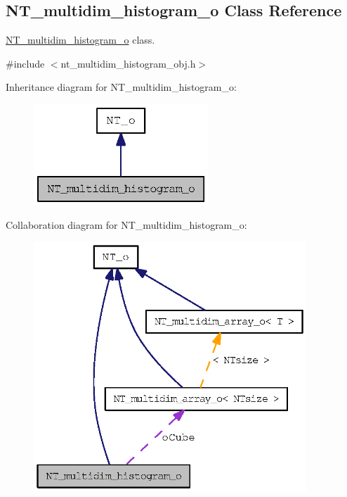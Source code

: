 \subsection{NT\_\-multidim\_\-histogram\_\-o Class Reference}
\label{class_n_t__multidim__histogram__o}


\hyperlink{class_n_t__multidim__histogram__o}{NT\_\-multidim\_\-histogram\_\-o} class.  




{\ttfamily \#include $<$nt\_\-multidim\_\-histogram\_\-obj.h$>$}



Inheritance diagram for NT\_\-multidim\_\-histogram\_\-o:
\nopagebreak
\begin{figure}[H]
\begin{center}
\leavevmode
\includegraphics[width=186pt]{class_n_t__multidim__histogram__o__inherit__graph}
\end{center}
\end{figure}


Collaboration diagram for NT\_\-multidim\_\-histogram\_\-o:
\nopagebreak
\begin{figure}[H]
\begin{center}
\leavevmode
\includegraphics[width=291pt]{class_n_t__multidim__histogram__o__coll__graph}
\end{center}
\end{figure}
